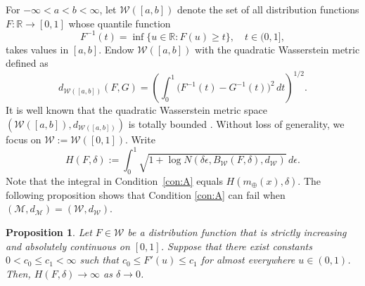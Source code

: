 \documentclass[11pt]{article}
\numberwithin{equation}{section}
\newtheorem{proposition}{Proposition}[section]
\newcommand{\M}{\mathcal{M}}
\newcommand{\W}{\mathcal{W}}
\newcommand{\R}{\mathbb{R}}
\newcommand{\dd}{\,d}
\begin{document}
For \(-\infty<a<b<\infty\), let \(\W([a,b])\) denote the set of all distribution functions \(F:\R\to[0,1]\) whose quantile function
\[
  F^{-1}(t)=\inf\{u\in\R:F(u)\ge t\},\quad t\in(0,1],
\]
takes values in \([a,b]\). Endow \(\W([a,b])\) with the quadratic Wasserstein metric defined as
\begin{equation}\label{eq:wass-dist}
    d_{\W([a,b])}(F,G)=\left(\int_0^1\big(F^{-1}(t)-G^{-1}(t)\big)^2\dd t\right)^{1/2}.
\end{equation}
It is well known that the quadratic Wasserstein metric space \((\W([a,b]),d_{\W([a,b])})\) is totally bounded \citep{PanaretosZemel2020}. Without loss of generality, we focus on \(\W:=\W([0,1])\). Write
\begin{equation}\label{eq:H}
    H(F,\delta):=\int_0^1 \sqrt{1+\log N(\delta \epsilon,B_\W(F,\delta),d_\W)}\dd \epsilon.
\end{equation}
Note that the integral in Condition~\ref{con:A} equals $H(m_\oplus(x),\delta)$. The following proposition shows that Condition \ref{con:A} can fail when $(\M,d_\M)=(\W,d_\W)$.

\begin{proposition} \label{thm:first}
    Let $F \in \mathcal{W}$ be a distribution function that is strictly increasing and absolutely continuous on $[0,1]$. Suppose that there exist constants \(0<c_0\le c_1<\infty\) such that $c_0\le F'(u)\le c_1$ for almost everywhere $u\in(0,1)$. Then, $H(F,\delta) \to \infty$ as $\delta \to 0$.
\end{proposition}
\end{document}
